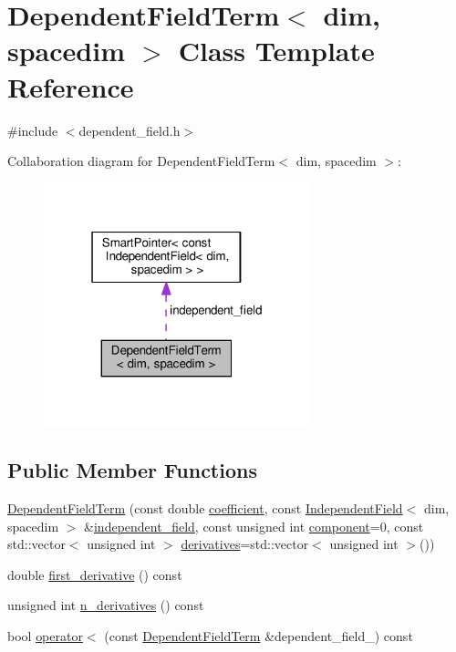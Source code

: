 \hypertarget{class_dependent_field_term}{}\section{Dependent\+Field\+Term$<$ dim, spacedim $>$ Class Template Reference}
\label{class_dependent_field_term}


{\ttfamily \#include $<$dependent\+\_\+field.\+h$>$}



Collaboration diagram for Dependent\+Field\+Term$<$ dim, spacedim $>$\+:\nopagebreak
\begin{figure}[H]
\begin{center}
\leavevmode
\includegraphics[width=220pt]{class_dependent_field_term__coll__graph}
\end{center}
\end{figure}
\subsection*{Public Member Functions}
\begin{DoxyCompactItemize}
\item 
\hyperlink{class_dependent_field_term_a149a09f602b0baadba9033d6a8da448c}{Dependent\+Field\+Term} (const double \hyperlink{class_dependent_field_term_a59a9183a32ac55fb728f3797b68a9f8f}{coefficient}, const \hyperlink{class_independent_field}{Independent\+Field}$<$ dim, spacedim $>$ \&\hyperlink{class_dependent_field_term_a89d1c3fea36e6fe105232097a321e095}{independent\+\_\+field}, const unsigned int \hyperlink{class_dependent_field_term_ac6f3ac40d4ee2c8b9f9bbdfa34079b74}{component}=0, const std\+::vector$<$ unsigned int $>$ \hyperlink{class_dependent_field_term_af09c5452c3e8e71e9ee99db304b90135}{derivatives}=std\+::vector$<$ unsigned int $>$())
\item 
double \hyperlink{class_dependent_field_term_a9c477ae87acdea43960f399ca2dd10b9}{first\+\_\+derivative} () const 
\item 
unsigned int \hyperlink{class_dependent_field_term_aa1c7aeb391135d4cafa1f208c15517ec}{n\+\_\+derivatives} () const 
\item 
bool \hyperlink{class_dependent_field_term_ab9934d7ad41e3a52073cc11293e7178b}{operator$<$} (const \hyperlink{class_dependent_field_term}{Dependent\+Field\+Term} \&dependent\+\_\+field\+\_) const 
\end{DoxyCompactItemize}
